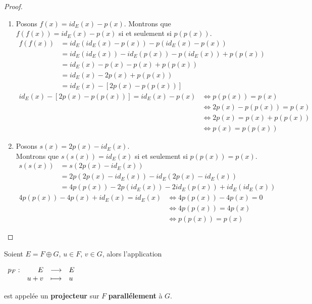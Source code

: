 \begin{proof}
    \begin{enumerate}
        \item Posons $f(x) = id_E(x) - p(x)$. Montrons que $f(f(x)) = id_E(x) - p(x)$ si et seulement si $p(p(x))$.
        \begin{align*}
            f(f(x)) &= id_E(id_E(x) - p(x)) - p(id_E(x) - p(x)) \\ 
            &= id_E(id_E(x)) - id_E(p(x)) - p(id_E(x)) + p(p(x)) \\ 
            &= id_E(x) - p(x) - p(x) + p(p(x)) \\ 
            &= id_E(x) - 2p(x) + p(p(x)) \\ 
            &= id_E(x) - [2p(x) - p(p(x))]
        \end{align*}
        \begin{align*}
            id_E(x) - [2p(x) - p(p(x))] = id_E(x) - p(x) &\iff p(p(x)) = p(x) \\ 
            &\iff 2p(x) - p(p(x)) = p(x) \\ 
            &\iff 2p(x) = p(x) + p(p(x)) \\
            &\iff p(x) = p(p(x))
        \end{align*}
        \item Posons $s(x) = 2p(x) - id_E(x)$. 
        \\
        Montrons que $s(s(x)) = id_E(x)$ si et seulement si $p(p(x)) = p(x)$.
        \begin{align*}
            s(s(x)) &= s(2p(x) - id_E(x)) \\
            &= 2p(2p(x) - id_E(x)) - id_E(2p(x) - id_E(x)) \\
            &= 4p(p(x)) - 2p(id_E(x)) - 2id_E(p(x)) + id_E(id_E(x))
        \end{align*}
        \begin{align*}
            4p(p(x)) - 4p(x) + id_E(x) = id_E(x) &\iff 4p(p(x)) - 4p(x) = 0 \\
            &\iff 4p(p(x)) = 4p(x) \\
            &\iff p(p(x)) = p(x)
        \end{align*}
    \end{enumerate}
\end{proof}

\begin{definition}
    Soient $E = F \oplus G$, $u \in F$, $v \in G$, alors l'application 
    \begin{center}
    	$
    	\begin{array}{rrcl} p_F : & E & \longrightarrow & E \\ & u+v & \longmapsto & u \end{array}
    	$
    \end{center}
    est appelée un \textbf{projecteur} sur $F$ \textbf{parallélement} à $G$.
\end{definition}

